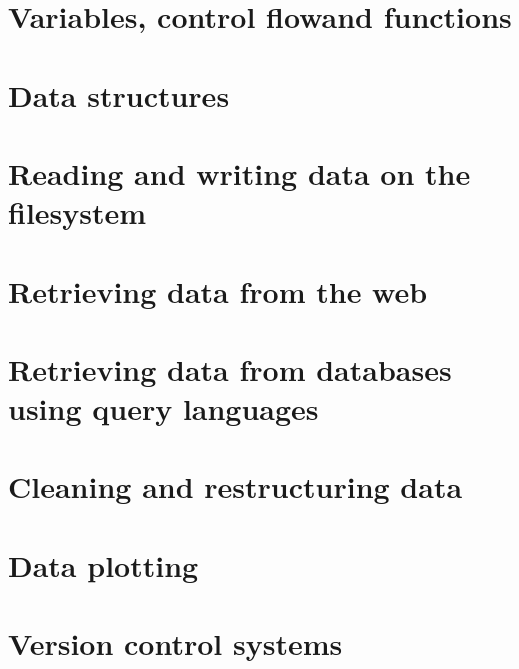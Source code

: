 
\section{Variables, control flowand functions}
\section{Data structures}
\section{Reading and writing data on the filesystem}
\section{Retrieving data from the web}
\section{Retrieving data from databases using query languages}
\section{Cleaning and restructuring data}
\section{Data plotting}
\section{Version control systems}



